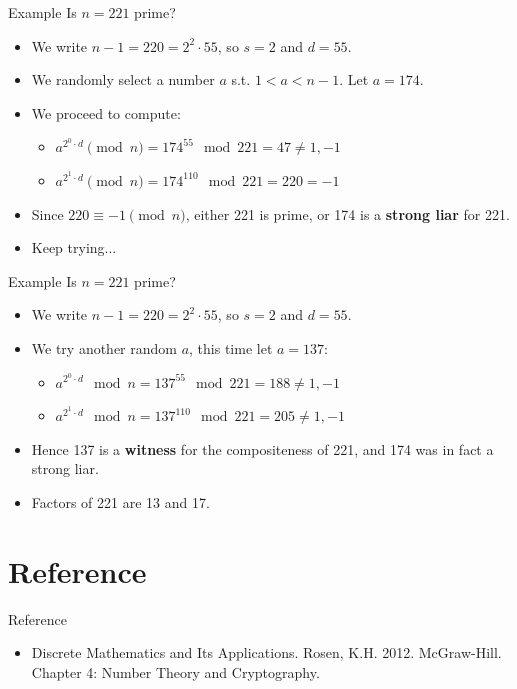 \documentclass{beamer}
\begin{document}
\begin{frame}{Example}
Is $n = 221$ prime?
    \begin{itemize}
        \item We write $n - 1 = 220 = 2^2 \cdot 55$, so $s = 2$ and $d = 55$.
        \item We randomly select a number $a$ s.t. $1 < a < n - 1$. Let $a = 174$. 
        \item We proceed to compute:
        \begin{itemize}
            \item $a^{2^0 \cdot d} \pmod{n} = 174^{55} \mod 221 = 47 \neq 1,- 1$
            \item $a^{2^1 \cdot d} \pmod{n} = 174^{110} \mod 221 = 220 = -1$
        \end{itemize}
        \item Since $220 \equiv −1 \pmod{n}$, either 221 is prime, or 174 is a \textbf{strong liar} for 221.
        \item Keep trying...
    \end{itemize}
\end{frame}

\begin{frame}{Example}
Is $n = 221$ prime?
    \begin{itemize}
        \item We write $n - 1 = 220 = 2^2 \cdot 55$, so $s = 2$ and $d = 55$.
        \item We try another random $a$, this time let $a = 137$:
        \begin{itemize}
            \item $a^{2^0 \cdot d} \mod n = 137^{55} \mod 221 = 188 \neq 1, -1$
            \item $a^{2^1 \cdot d} \mod n = 137^{110} \mod 221 = 205 \neq 1, -1$
        \end{itemize}
        \item Hence 137 is a \textbf{witness} for the compositeness of 221, and 174 was in fact a strong liar.
        \item Factors of 221 are 13 and 17.
    \end{itemize}
\end{frame}

\section*{Reference}

\begin{frame}{Reference}
    \begin{itemize}
        \item Discrete Mathematics and Its Applications. Rosen, K.H. 2012. McGraw-Hill. \\
        Chapter 4: Number Theory and Cryptography.
    \end{itemize}
\end{frame}
\end{document}

